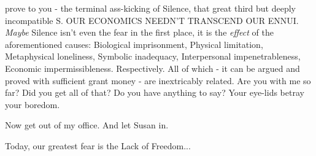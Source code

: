 \documentclass{article}
\begin{document}
prove to you - the terminal ass-kicking of Silence, that great third but
deeply incompatible S. OUR ECONOMICS NEEDN'T TRANSCEND OUR ENNUI.
\textit{Maybe} Silence isn't even the fear in the first place, it is the
\textit{effect} of the aforementioned causes: Biological imprisonment,
Physical limitation, Metaphysical loneliness, Symbolic inadequacy,
Interpersonal impenetrableness, Economic impermissibleness.
Respectively. All of which - it can be argued and proved with sufficient
grant money - are inextricably related. Are you with me so far? Did you
get all of that? Do you have anything to say? Your eye-lids betray your
boredom. \newline\newline


Now get out of my office. And let Susan in. \newline\newline

Today, our greatest fear is the Lack of Freedom...
\end{document}
